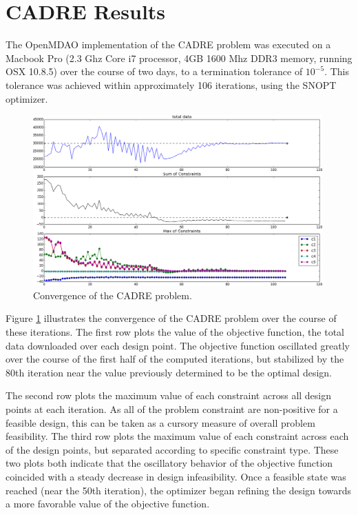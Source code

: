 \documentclass[]{aiaa-tc} %
\begin{document}
  \section{CADRE Results}

  The OpenMDAO implementation of the CADRE problem was executed on a 
  Macbook Pro (2.3 Ghz Core i7 processor, 4GB 1600 Mhz DDR3 memory, running OSX 10.8.5)
  over the course of two days, to a termination tolerance of $10^{-5}$. This tolerance
  was achieved within approximately 106 iterations, using the SNOPT\cite{gill2005snopt}
  optimizer.

  \begin{figure}
  \centering
  \includegraphics[width=0.99\textwidth]{images/opt.png}
  \caption[width=0.22\textwidth]{Convergence of the CADRE problem.}
  \label{convergence}
  \end{figure}


  Figure \ref{convergence} illustrates the convergence of the CADRE problem over the course of
  these iterations. The first row plots the
  value of the objective function, the total data downloaded over each design point. The objective
  function oscillated greatly over the course of the first half of the computed iterations, but
  stabilized by the 80th iteration near the value previously determined \cite{CADRE2012}
  to be the optimal design.

  The second row plots the maximum value of each constraint across all design points at
  each iteration. As all of the problem constraint are non-positive for a feasible design,
  this can be taken as a cursory measure of overall problem feasibility.
  The third row plots the maximum value of each constraint across each of the design points,
  but separated according to specific constraint type. These two plots both indicate that the
  oscillatory behavior of the objective function coincided with a steady decrease in design
  infeasibility. Once a feasible state was reached (near the 50th iteration), the optimizer
  began refining the design towards a more favorable value of the objective function.
\end{document}
